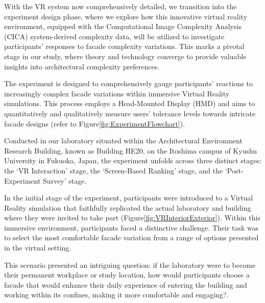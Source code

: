 %    



With the VR system now comprehensively detailed, we transition into the experiment design phase, where we explore how this innovative virtual reality environment, equipped with the Computational Image Complexity Analysis (CICA) system-derived complexity data, will be utilized to investigate participants' responses to facade complexity variations.
This marks a pivotal stage in our study, where theory and technology converge to provide valuable insights into architectural complexity preferences.

The experiment is designed to comprehensively gauge participants' reactions to increasingly complex facade variations within immersive Virtual Reality simulations.
This process employs a Head-Mounted Display (HMD) and aims to quantitatively and qualitatively measure users' tolerance levels towards intricate facade designs (refer to Figure\ref{fig:ExperimentFlowchart}).

Conducted in our laboratory situated within the Architectural Environment Research Building, known as Building HE20, on the Itoshima campus of Kyushu University in Fukuoka, Japan, the experiment unfolds across three distinct stages: the `VR Interaction' stage, the `Screen-Based Ranking' stage, and the `Post-Experiment Survey' stage.




In the initial stage of the experiment, participants were introduced to a Virtual Reality simulation that faithfully replicated the actual laboratory and building where they were invited to take part (Figure\ref{fig:VRInteriorExterior}).
Within this immersive environment, participants faced a distinctive challenge.
Their task was to select the most comfortable facade variation from a range of options presented in the virtual setting.

This scenario presented an intriguing question: if the laboratory were to become their permanent workplace or study location, how would participants choose a facade that would enhance their daily experience of entering the building and working within its confines, making it more comfortable and engaging?.

